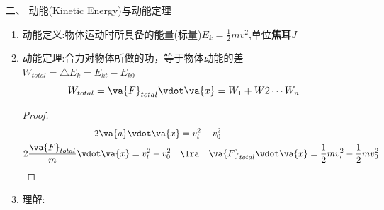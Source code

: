 \documentclass{article}
\begin{document}
\begin{itemize}
\begin{enumerate}
                  \vspace{2em}

              \item[二、] 动能(Kinetic Energy)与动能定理
                  \begin{enumerate}
                      \item 动能定义:物体运动时所具备的能量(标量)$E_{k} = \frac{1}{2}mv^{2}$,单位\textbf{焦耳$J$}
                      \item 动能定理:合力对物体所做的功，等于物体动能的差$W_{total} = \triangle E_{k} = E_{kt} - E_{k0}$
                            $$
                                W_{total} = \va{F}_{total} \vdot \va{x} = W_{1} + W{2} \cdots W_{n}
                            $$

                            \begin{proof}
                                \begin{align*}
                                    2\va{a} \vdot \va{x}                                                    & = v_{t}^{2} - v_{0}^{2}                                                                \\
                                    2 \dfrac{\va{F}_{total}}{m} \vdot \va{x} = v_{t}^{2} - v_{0}^{2}  \quad & \lra  \quad \va{F}_{total} \vdot \va{x} = \frac{1}{2}mv_{t}^{2} -\frac{1}{2}mv_{0}^{2}
                                \end{align*}
                            \end{proof}

                        \item 理解:


                  \end{enumerate}

          \end{enumerate}
\end{itemize}
\end{document}
